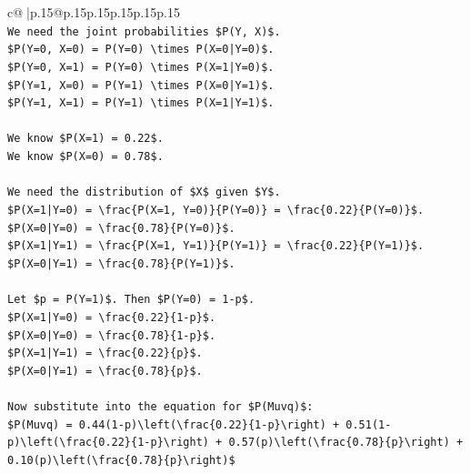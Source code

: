 \documentclass{article}
\begin{document}
{\begin{supertabular}{c@{$\;$}|p{.15\linewidth}@{}p{.15\linewidth}p{.15\linewidth}p{.15\linewidth}p{.15\linewidth}p{.15\linewidth}}
{{{\\ 
\texttt{We need the joint probabilities \$P(Y, X)\$.} \\
\texttt{\$P(Y=0, X=0) = P(Y=0) \textbackslash{}times P(X=0|Y=0)\$.} \\
\texttt{\$P(Y=0, X=1) = P(Y=0) \textbackslash{}times P(X=1|Y=0)\$.} \\
\texttt{\$P(Y=1, X=0) = P(Y=1) \textbackslash{}times P(X=0|Y=1)\$.} \\
\texttt{\$P(Y=1, X=1) = P(Y=1) \textbackslash{}times P(X=1|Y=1)\$.} \\
\\ 
\texttt{We know \$P(X=1) = 0.22\$.} \\
\texttt{We know \$P(X=0) = 0.78\$.} \\
\\ 
\texttt{We need the distribution of \$X\$ given \$Y\$.} \\
\texttt{\$P(X=1|Y=0) = \textbackslash{}frac\{P(X=1, Y=0)\}\{P(Y=0)\} = \textbackslash{}frac\{0.22\}\{P(Y=0)\}\$.} \\
\texttt{\$P(X=0|Y=0) = \textbackslash{}frac\{0.78\}\{P(Y=0)\}\$.} \\
\texttt{\$P(X=1|Y=1) = \textbackslash{}frac\{P(X=1, Y=1)\}\{P(Y=1)\} = \textbackslash{}frac\{0.22\}\{P(Y=1)\}\$.} \\
\texttt{\$P(X=0|Y=1) = \textbackslash{}frac\{0.78\}\{P(Y=1)\}\$.} \\
\\ 
\texttt{Let \$p = P(Y=1)\$. Then \$P(Y=0) = 1{-}p\$.} \\
\texttt{\$P(X=1|Y=0) = \textbackslash{}frac\{0.22\}\{1{-}p\}\$.} \\
\texttt{\$P(X=0|Y=0) = \textbackslash{}frac\{0.78\}\{1{-}p\}\$.} \\
\texttt{\$P(X=1|Y=1) = \textbackslash{}frac\{0.22\}\{p\}\$.} \\
\texttt{\$P(X=0|Y=1) = \textbackslash{}frac\{0.78\}\{p\}\$.} \\
\\ 
\texttt{Now substitute into the equation for \$P(Muvq)\$:} \\
\texttt{\$P(Muvq) = 0.44(1{-}p)\textbackslash{}left(\textbackslash{}frac\{0.22\}\{1{-}p\}\textbackslash{}right) + 0.51(1{-}p)\textbackslash{}left(\textbackslash{}frac\{0.22\}\{1{-}p\}\textbackslash{}right) + 0.57(p)\textbackslash{}left(\textbackslash{}frac\{0.78\}\{p\}\textbackslash{}right) + 0.10(p)\textbackslash{}left(\textbackslash{}frac\{0.78\}\{p\}\textbackslash{}right)\$} \\
\\ 
}}}
\end{supertabular}}
\end{document}
